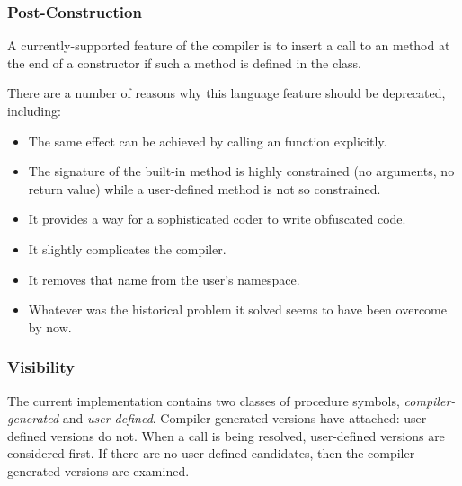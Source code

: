 \subsubsection{Post-Construction}

A currently-supported feature of the compiler is to insert a call to an 
method at the end of a constructor if such a method is defined in the class.

There are a number of reasons why this language feature should be deprecated, including:
\begin{itemize}
\item The same effect can be achieved by calling an  function explicitly.
\item The signature of the built-in  method is highly constrained (no
  arguments, no return value) while a user-defined  method is not so
  constrained. 
\item It provides a way for a sophisticated coder to write obfuscated code.
\item It slightly complicates the compiler.
\item It removes that name from the user's namespace.
\item Whatever was the historical problem it solved seems to have been overcome by now.
\end{itemize}

\subsubsection{Visibility}

The current implementation contains two classes of procedure symbols,
\emph{compiler-generated} and \emph{user-defined}.  Compiler-generated versions have
 attached: user-defined versions do not.  When a call is
being resolved, user-defined versions are considered first.  If there are no user-defined
candidates, then the compiler-generated versions are examined.

